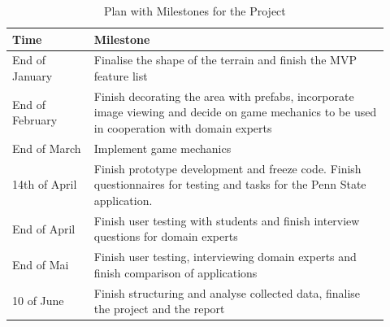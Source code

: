     \FloatBarrier
    \begin{table}
    \label{tab:plan}
    \caption{Plan with Milestones for the Project}
    \begin{tabular}{| p{0.2\linewidth} | p{0.725\linewidth} |}
        \hline
        \textbf{Time} & \textbf{Milestone} \\
        \hline
        End of January & Finalise the shape of the terrain and finish the MVP feature list \\
        End of February & Finish decorating the area with prefabs, incorporate image viewing and decide on game mechanics to be used in cooperation with domain experts \\
        End of March & Implement game mechanics \\
        14th of April & Finish prototype development and freeze code. Finish questionnaires for testing and tasks for the Penn State application. \\
        End of April & Finish user testing with students and finish interview questions for domain experts \\
        End of Mai & Finish user testing, interviewing domain experts and finish comparison of applications \\
        10 of June & Finish structuring and analyse collected data, finalise the project and the report \\
        \hline
    \end{tabular}
    \end{table}
    \FloatBarrier

